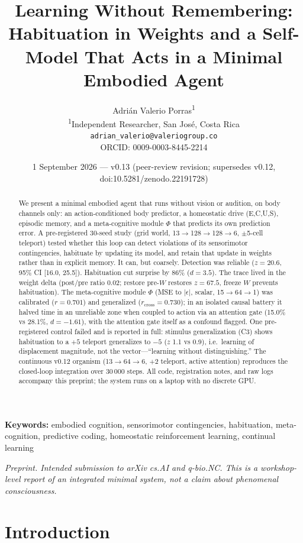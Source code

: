 \documentclass[11pt,a4paper]{article}
\title{Learning Without Remembering: Habituation in Weights and a Self-Model That Acts in a Minimal Embodied Agent}
\author{Adri\'an Valerio Porras\textsuperscript{1} \\ \small \textsuperscript{1}Independent Researcher, San Jos\'e, Costa Rica \\ \small \texttt{adrian\_valerio@valeriogroup.co} \\ \small ORCID: 0009-0003-8445-2214 }
\date{1 September 2026 --- v0.13 (peer-review revision; supersedes v0.12, doi:10.5281/zenodo.22191728)}
\begin{document}
\maketitle

\begin{abstract}
We present a minimal embodied agent that runs without vision or audition, on body channels only: an action-conditioned body predictor, a homeostatic drive (E,C,U,S), episodic memory, and a meta-cognitive module $\Phi$ that predicts its own prediction error. A pre-registered 30-seed study (grid world, 13$\rightarrow$128$\rightarrow$128$\rightarrow$6, $\pm$5-cell teleport) tested whether this loop can detect violations of its sensorimotor contingencies, habituate by updating its model, and retain that update in weights rather than in explicit memory. It can, but coarsely. Detection was reliable ($z=20.6$, 95\% CI [16.0, 25.5]). Habituation cut surprise by 86\% ($d=3.5$). The trace lived in the weight delta (post/pre ratio 0.02; restore pre-$W$ restores $z=67.5$, freeze $W$ prevents habituation). The meta-cognitive module $\Phi$ (MSE to $|\epsilon|$, scalar, 15$\rightarrow$64$\rightarrow$1) was calibrated ($r=0.701$) and generalized ($r_{\mathrm{cross}}=0.730$); in an isolated causal battery it halved time in an unreliable zone when coupled to action via an attention gate (15.0\% vs 28.1\%, $d=-1.61$), with the attention gate itself as a confound flagged. One pre-registered control failed and is reported in full: stimulus generalization (C3) shows habituation to a $+5$ teleport generalizes to $-5$ ($z$ 1.1 vs 0.9), i.e.\ learning of displacement magnitude, not the vector---``learning without distinguishing.'' The continuous v0.12 organism (13$\rightarrow$64$\rightarrow$6, $+$2 teleport, active attention) reproduces the closed-loop integration over 30\,000 steps. All code, registration notes, and raw logs accompany this preprint; the system runs on a laptop with no discrete GPU.
\end{abstract}

\noindent\textbf{Keywords:} embodied cognition, sensorimotor contingencies, habituation, meta-cognition, predictive coding, homeostatic reinforcement learning, continual learning

\noindent\textit{Preprint. Intended submission to arXiv cs.AI and q-bio.NC. This is a workshop-level report of an integrated minimal system, not a claim about phenomenal consciousness.}


\section{Introduction}
\end{document}
